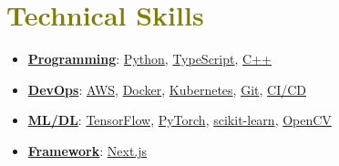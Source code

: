 

\section{\textcolor{olive}{\textbf{Technical Skills}}}

    \vspace{1.0mm}

    \begin{itemize}[
        leftmargin=0.20in, 
        label={-}, 
        itemsep=-2pt, 
        topsep=0pt,
        rightmargin=0.10in
    ]
        \item \underline{\textbf{Programming}}: \underline{Python}, \underline{TypeScript}, \underline{C++}
        \item \underline{\textbf{DevOps}}: \underline{AWS}, \underline{Docker}, \underline{Kubernetes}, \underline{Git}, \underline{CI/CD}
        \item \underline{\textbf{ML/DL}}: \underline{TensorFlow}, \underline{PyTorch}, \underline{scikit-learn}, \underline{OpenCV}
        \item \underline{\textbf{Framework}}: \underline{Next.js}
    \end{itemize}
